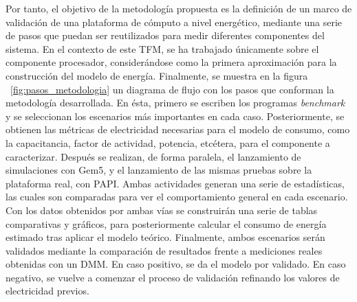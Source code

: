 Por tanto, el objetivo de la metodología propuesta es la definición de un marco de validación de una plataforma de cómputo a nivel energético, mediante una serie de pasos que puedan ser reutilizados para medir diferentes componentes del sistema. En el contexto de este \ac{TFM}, se ha trabajado únicamente sobre el componente procesador, considerándose como la primera aproximación para la construcción del modelo de energía.
Finalmente, se muestra en la figura ~\ref{fig:pasos_metodologia} un diagrama de flujo con los pasos que conforman la metodología desarrollada. En ésta, primero se escriben los programas \textit{benchmark} y se seleccionan los escenarios más importantes en cada caso. Posteriormente, se obtienen las métricas de electricidad necesarias para el modelo de consumo, como la capacitancia, factor de actividad, potencia, etcétera, para el componente a caracterizar. Después se realizan, de forma paralela, el lanzamiento de simulaciones con Gem5, y el lanzamiento de las mismas pruebas sobre la plataforma real, con PAPI. Ambas actividades generan una serie de estadísticas, las cuales son comparadas para ver el comportamiento general en cada escenario. Con los datos obtenidos por ambas vías se construirán una serie de tablas comparativas y gráficos, para posteriormente calcular el consumo de energía estimado tras aplicar el modelo teórico. Finalmente, ambos escenarios serán validados mediante la comparación de resultados frente a mediciones reales obtenidas con un DMM. En caso positivo, se da el modelo por validado. En caso negativo, se vuelve a comenzar el proceso de validación refinando los valores de electricidad previos. 

\pagebreak

